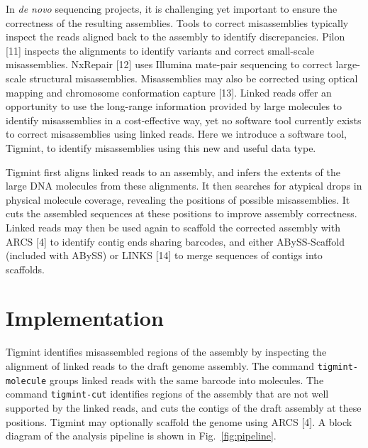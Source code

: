 \documentclass{bmcart}
\begin{document}
In \emph{de novo} sequencing projects, it is challenging yet important to ensure the correctness of the resulting assemblies. Tools to correct misassemblies typically inspect the reads aligned back to the assembly to identify discrepancies. Pilon {[}11{]} inspects the alignments to identify variants and correct small-scale misassemblies. NxRepair {[}12{]} uses Illumina mate-pair sequencing to correct large-scale structural misassemblies. Misassemblies may also be corrected using optical mapping and chromosome conformation capture {[}13{]}. Linked reads offer an opportunity to use the long-range information provided by large molecules to identify misassemblies in a cost-effective way, yet no software tool currently exists to correct misassemblies using linked reads. Here we introduce a software tool, Tigmint, to identify misassemblies using this new and useful data type.

Tigmint first aligns linked reads to an assembly, and infers the extents of the large DNA molecules from these alignments. It then searches for atypical drops in physical molecule coverage, revealing the positions of possible misassemblies. It cuts the assembled sequences at these positions to improve assembly correctness. Linked reads may then be used again to scaffold the corrected assembly with ARCS {[}4{]} to identify contig ends sharing barcodes, and either ABySS-Scaffold (included with ABySS) or LINKS {[}14{]} to merge sequences of contigs into scaffolds.

\hypertarget{implementation}{%
\section*{Implementation}\label{implementation}}

Tigmint identifies misassembled regions of the assembly by inspecting the alignment of linked reads to the draft genome assembly. The command \texttt{tigmint-molecule} groups linked reads with the same barcode into molecules. The command \texttt{tigmint-cut} identifies regions of the assembly that are not well supported by the linked reads, and cuts the contigs of the draft assembly at these positions. Tigmint may optionally scaffold the genome using ARCS {[}4{]}. A block diagram of the analysis pipeline is shown in Fig.~\ref{fig:pipeline}.
\end{document}
